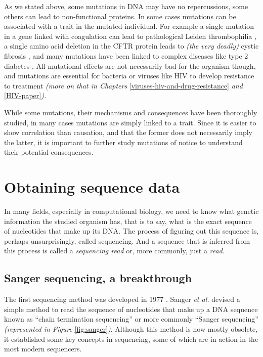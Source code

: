 \documentclass[
  11pt,
  twoside,
  BCOR=10mm,
  listof=totoc]{scrbook}
\begin{document}
As we stated above, some mutations in DNA may have no repercussions, some others can lead to non-functional proteins. In some cases mutations can be associated with a trait in the mutated individual. For example a single mutation in a gene linked with coagulation can lead to pathological Leiden thrombophilia \autocite{kujovichFactorLeidenThrombophilia2011}, a single amino acid deletion in the CFTR protein leads to \emph{(the very deadly)} cystic fibrosis \autocite{cuttingCysticFibrosisGenetics2015}, and many mutations have been linked to complex diseases like type 2 diabetes \autocite{fuchsbergerGeneticArchitectureType2016,morrisLargescaleAssociationAnalysis2012}. All mutational effects are not necessarily bad for the organism though, and mutations are essential for bacteria \autocite{woodfordEmergenceAntibioticResistance2007} or viruses like HIV \autocite{rheeHumanImmunodeficiencyVirus2003} to develop resistance to treatment \emph{(more on that in Chapters} \ref{viruses-hiv-and-drug-resistance} \emph{and} \ref{HIV-paper}\emph{).}

While some mutations, their mechanisms and consequences have been thoroughly studied, in many cases mutations are simply linked to a trait. Since it is easier to show correlation than causation, and that the former does not necessarily imply the latter, it is important to further study mutations of notice to understand their potential consequences.

\hypertarget{obtaining-sequence-data}{%
\section{Obtaining sequence data}\label{obtaining-sequence-data}}

In many fields, especially in computational biology, we need to know what genetic information the studied organism has, that is to say, what is the exact sequence of nucleotides that make up its DNA. The process of figuring out this sequence is, perhaps unsurprisingly, called sequencing. And a sequence that is inferred from this process is called a \emph{sequencing read} or, more commonly, just a \emph{read}.

\hypertarget{sanger-sequencing-a-breakthrough}{%
\subsection{Sanger sequencing, a breakthrough}\label{sanger-sequencing-a-breakthrough}}

The first sequencing method was developed in 1977 \autocite{sangerDNASequencingChainterminating1977}. Sanger \emph{et al.} devised a simple method to read the sequence of nucleotides that make up a DNA sequence known as ``chain termination sequencing'' or more commonly ``Sanger sequencing'' \emph{(represented in Figure} \ref{fig:sanger}\emph{)}. Although this method is now mostly obsolete, it established some key concepts in sequencing, some of which are in action in the most modern sequencers.
\end{document}
